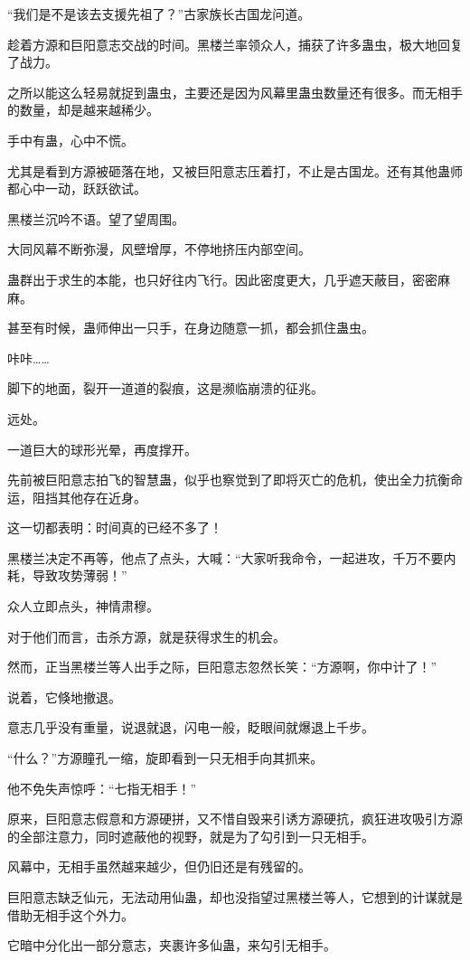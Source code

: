 \begin{this_body}
“我们是不是该去支援先祖了？”古家族长古国龙问道。

趁着方源和巨阳意志交战的时间。黑楼兰率领众人，捕获了许多蛊虫，极大地回复了战力。

之所以能这么轻易就捉到蛊虫，主要还是因为风幕里蛊虫数量还有很多。而无相手的数量，却是越来越稀少。

手中有蛊，心中不慌。

尤其是看到方源被砸落在地，又被巨阳意志压着打，不止是古国龙。还有其他蛊师都心中一动，跃跃欲试。

黑楼兰沉吟不语。望了望周围。

大同风幕不断弥漫，风壁增厚，不停地挤压内部空间。

蛊群出于求生的本能，也只好往内飞行。因此密度更大，几乎遮天蔽目，密密麻麻。

甚至有时候，蛊师伸出一只手，在身边随意一抓，都会抓住蛊虫。

咔咔……

脚下的地面，裂开一道道的裂痕，这是濒临崩溃的征兆。

远处。

一道巨大的球形光晕，再度撑开。

先前被巨阳意志拍飞的智慧蛊，似乎也察觉到了即将灭亡的危机，使出全力抗衡命运，阻挡其他存在近身。

这一切都表明：时间真的已经不多了！

黑楼兰决定不再等，他点了点头，大喊：“大家听我命令，一起进攻，千万不要内耗，导致攻势薄弱！”

众人立即点头，神情肃穆。

对于他们而言，击杀方源，就是获得求生的机会。

然而，正当黑楼兰等人出手之际，巨阳意志忽然长笑：“方源啊，你中计了！”

说着，它倏地撤退。

意志几乎没有重量，说退就退，闪电一般，眨眼间就爆退上千步。

“什么？”方源瞳孔一缩，旋即看到一只无相手向其抓来。

他不免失声惊呼：“七指无相手！”

原来，巨阳意志假意和方源硬拼，又不惜自毁来引诱方源硬抗，疯狂进攻吸引方源的全部注意力，同时遮蔽他的视野，就是为了勾引到一只无相手。

风幕中，无相手虽然越来越少，但仍旧还是有残留的。

巨阳意志缺乏仙元，无法动用仙蛊，却也没指望过黑楼兰等人，它想到的计谋就是借助无相手这个外力。

它暗中分化出一部分意志，夹裹许多仙蛊，来勾引无相手。


\end{this_body}
